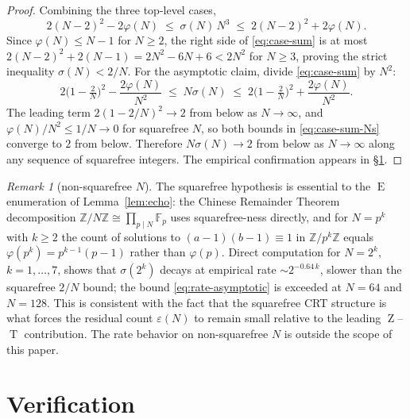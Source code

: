 \documentclass[11pt,reqno]{amsart}
\theoremstyle{plain}
\theoremstyle{definition}
\theoremstyle{remark}
\newtheorem*{remark}{Remark}
\DeclareMathOperator{\ECHO}{E}
\DeclareMathOperator{\HARM}{T}
\DeclareMathOperator{\VOID}{Z}
\newcommand{\ZN}{\mathbb{Z}/N\mathbb{Z}}
\newcommand{\Z}{\mathbb{Z}}
\begin{document}
\begin{proof}
\medskip
Combining the three top-level cases,
\begin{equation}\label{eq:case-sum}
  2(N-2)^{2}-2\varphi(N)\;\le\;\sigma(N)\,N^{3}\;\le\;2(N-2)^{2}+2\varphi(N).
\end{equation}
Since $\varphi(N)\le N-1$ for $N\ge 2$, the right side of
\eqref{eq:case-sum} is at most
$2(N-2)^{2}+2(N-1)=2N^{2}-6N+6<2N^{2}$ for $N\ge 3$, proving the
strict inequality $\sigma(N)<2/N$. For the asymptotic claim, divide
\eqref{eq:case-sum} by $N^{2}$:
\begin{equation}\label{eq:case-sum-Ns}
  2\bigl(1-\tfrac{2}{N}\bigr)^{2}-\frac{2\varphi(N)}{N^{2}}
  \;\le\;N\sigma(N)\;\le\;
  2\bigl(1-\tfrac{2}{N}\bigr)^{2}+\frac{2\varphi(N)}{N^{2}}.
\end{equation}
The leading term $2(1-2/N)^{2}\to 2$ from below as $N\to\infty$, and
$\varphi(N)/N^{2}\le 1/N\to 0$ for squarefree $N$, so both bounds in
\eqref{eq:case-sum-Ns} converge to $2$ from below. Therefore
$N\sigma(N)\to 2$ from below as $N\to\infty$ along any sequence of
squarefree integers. The empirical confirmation appears in
\S\ref{sec:verify}.
\end{proof}

\begin{remark}[non-squarefree $N$]
The squarefree hypothesis is essential to the $\ECHO$ enumeration of
Lemma~\ref{lem:echo}: the Chinese Remainder Theorem decomposition
$\ZN\cong\prod_{p\mid N}\mathbb F_{p}$ uses squarefree-ness directly,
and for $N=p^{k}$ with $k\ge 2$ the count of solutions to
$(a-1)(b-1)\equiv 1$ in $\Z/p^{k}\Z$ equals $\varphi(p^{k})=p^{k-1}(p-1)$
rather than $\varphi(p)$. Direct computation for $N=2^{k}$,
$k=1,\ldots,7$, shows that $\sigma(2^{k})$ decays at empirical rate
$\sim 2^{-0.64\,k}$, slower than the squarefree $2/N$ bound; the
bound \eqref{eq:rate-asymptotic} is exceeded at $N=64$ and $N=128$.
This is consistent with the fact that the squarefree CRT structure is what
forces the residual count $\varepsilon(N)$ to remain small relative
to the leading $\VOID$--$\HARM$ contribution. The rate behavior on
non-squarefree $N$ is outside the scope of this paper.
\end{remark}

\section{Verification}\label{sec:verify}
\end{document}
